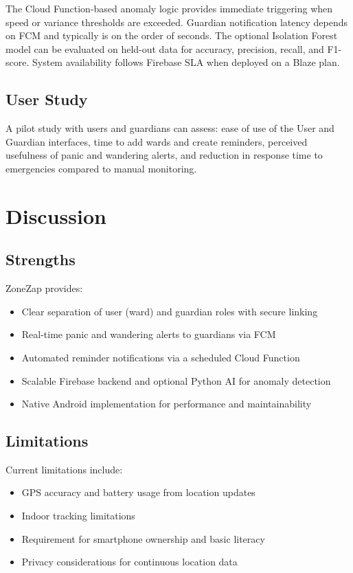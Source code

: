 \documentclass[conference]{IEEEtran}
\begin{document}
The Cloud Function-based anomaly logic provides immediate triggering when speed or variance thresholds are exceeded. Guardian notification latency depends on FCM and typically is on the order of seconds. The optional Isolation Forest model can be evaluated on held-out data for accuracy, precision, recall, and F1-score. System availability follows Firebase SLA when deployed on a Blaze plan.

\subsection{User Study}

A pilot study with users and guardians can assess: ease of use of the User and Guardian interfaces, time to add wards and create reminders, perceived usefulness of panic and wandering alerts, and reduction in response time to emergencies compared to manual monitoring.

\section{Discussion}

\subsection{Strengths}

ZoneZap provides:
\begin{itemize}
    \item Clear separation of user (ward) and guardian roles with secure linking
    \item Real-time panic and wandering alerts to guardians via FCM
    \item Automated reminder notifications via a scheduled Cloud Function
    \item Scalable Firebase backend and optional Python AI for anomaly detection
    \item Native Android implementation for performance and maintainability
\end{itemize}

\subsection{Limitations}

Current limitations include:
\begin{itemize}
    \item GPS accuracy and battery usage from location updates
    \item Indoor tracking limitations
    \item Requirement for smartphone ownership and basic literacy
    \item Privacy considerations for continuous location data
\end{itemize}
\end{document}
